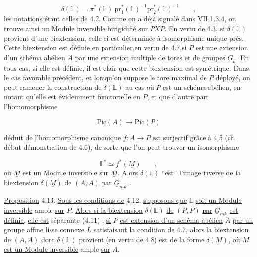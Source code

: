\begin{equation}\tag{4.12.1}
\delta(\mathbb{L}) = \pi^{*}(\mathbb{L})\ \mathrm{pr}_{1}^{*}(\mathbb{L})^{-1}\mathrm{pr}_{2}^{*}(\mathbb{L})^{-1} \qquad ,
\end{equation}
les notations étant celles de 4.2. Comme on a déjà signalé dans VII 1.3.4, on trouve ainsi un Module inversible birigidifié sur $PXP$. En vertu de 4.3, si $\delta(\mathbb{L})$ provient d'une biextension, celle-ci est déterminée à isomorphisme unique près. Cette biextension est définie en particulier,en vertu de 4.7,si $P$ est une extension d'un schéma abélien $A$ par une extension multiple de tores et de groupes $\underline{G}_a$. En tous cas, si elle est définie, il est clair que cette biextension est symétrique. Dans le cas favorable précédent, et lorsqu'on suppose le tore maximal de $P$ déployé, on peut ramener la construction de $\delta(\mathbb{L})$ au cas où $P$ est un schéma abélien, en notant qu'elle est évidemment fonctorielle en $P$, et que d'autre part l'homomorphisme

\begin{equation}\tag{4.12.2}
\mathrm{Pic}(A) \longrightarrow \mathrm{Pic}(P) 
\end{equation}


 déduit de l'homomorphisme canonique $f : A \longrightarrow P$ est surjectif grâce à 4.5 (cf. début démonstration de 4.6), de sorte que l'on peut trouver un isomorphisme

\begin{equation*}
\mathbb{L}^{*} \simeq f^{*}(\underline{M}) \qquad ,
\end{equation*}
où $\underline{M}$ est un Module inversible sur $\underline{M}$. Alors $\delta(\mathbb{L})$ ``est'' l'image inverse de la biextension $\delta(\underline{M})$ de $(A,A)$ par $\underline{G}_{mk}$ .

\underline{Proposition} 4.13. \underline{Sous les conditions de} 4.12, \underline{supposons que} $\mathbb{L}$ \underline{soit un Module inversible} ample \underline{sur} $P$. \underline{Alors si la biextension} $\delta(\mathbb{L})$ \underline{de} $(P,P)$ \underline{par} $\underline{G}_{mk}$ \underline{est définie,} \underline{elle est} séparante (4.11) ; \underline{si} $P$ \underline{est extension d'un schéma abélien} $A$ \underline{par un groupe affine lisse connexe} $L$ \underline{satisfaisant la condition de} 4.7, \underline{alors la biextension de} $(A,A)$ \underline{dont} $\delta(\mathbb{L})$ \underline{provient} (\underline{en vertu de} 4.8) \underline{est de la forme} $\delta(\underline{M})$, \underline{où} $\underline{M}$ \underline{est un Module inversible} ample \underline{sur} $A$.

